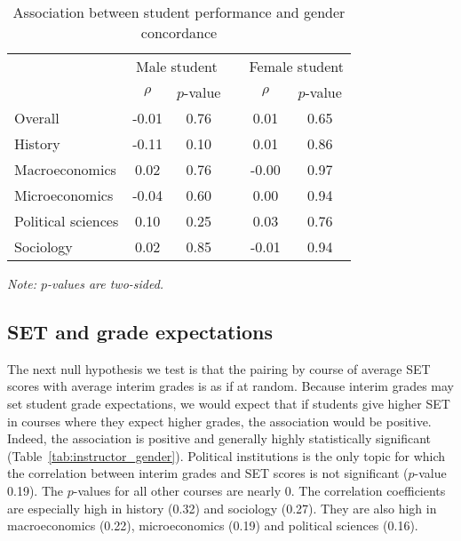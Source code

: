 \documentclass[12pt]{article}
\begin{document}
\begin{table}[htbp]
  \centering
  \footnotesize 
  \caption{Association between student performance and gender concordance}
    \begin{tabular}{lccccc}
    \toprule 
          & \multicolumn{2}{c}{Male student}  &  & \multicolumn{2}{c}{Female student} \\
      & $\rho$  &  $p$-value &  & $\rho$  &  $p$-value    \\
                             \midrule
      \quad  Overall &                 -0.01       & 0.76 & &  0.01       & 0.65  \\
      \quad  History &                 -0.11       & 0.10 & &  0.01       & 0.86   \\
      \quad  Macroeconomics &           0.02       & 0.76 & & -0.00       & 0.97   \\
      \quad  Microeconomics &          -0.04       & 0.60 & &  0.00       & 0.94  \\
      \quad  Political sciences &       0.10       & 0.25 & &  0.03       & 0.76  \\
      \quad  Sociology &                0.02       & 0.85 & & -0.01       & 0.94  \\
    \bottomrule
    \end{tabular}%
 \label{tab:finalconcordance}%
  
  \textit{Note: $p$-values are two-sided.}
\end{table}%
\normalsize

\subsection{SET and grade expectations}
The next null hypothesis we test is that the pairing by course of average SET scores with
average interim grades is as if at random.
Because interim grades may set student grade expectations, we would expect that if
students give higher SET in courses where they expect higher grades, the association
would be positive.
Indeed, the association is positive and generally highly statistically significant 
(Table~\ref{tab:instructor_gender}). 
Political institutions is the only topic for which the correlation between interim grades and 
SET scores is not significant ($p$-value 0.19). 
The $p$-values for all other courses are nearly 0. 
The correlation coefficients are especially high in history (0.32) and sociology (0.27). 
They are also high in macroeconomics (0.22), microeconomics (0.19) and political sciences (0.16).
\end{document}

